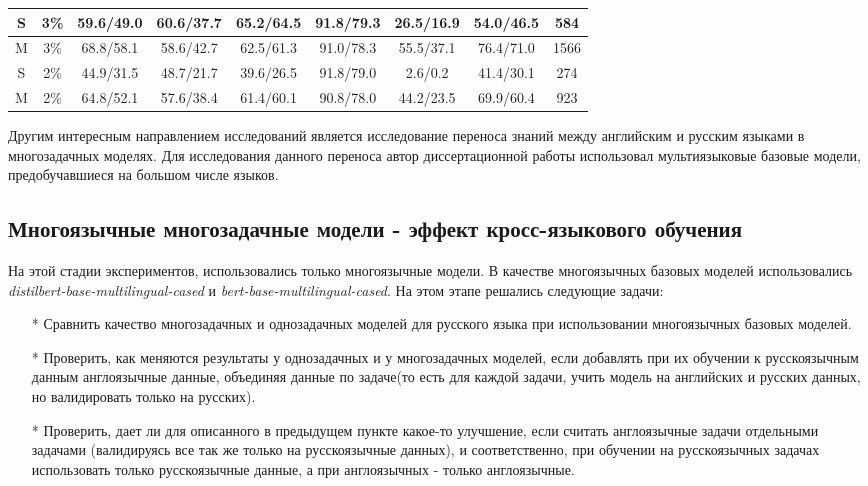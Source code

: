 \begin{table*}
{\begin{tabular}{c|c|c|c|c|c|c|c|c}
S & 3\% & 59.6/49.0 & 60.6/37.7 & 65.2/64.5 & 91.8/79.3 & 26.5/16.9 & 54.0/46.5 & 584 \\ \hline
M & 3\% & 68.8/58.1 & 58.6/42.7 & 62.5/61.3 & 91.0/78.3 & 55.5/37.1 & 76.4/71.0 & 1566 \\ \hline
S & 2\% & 44.9/31.5 & 48.7/21.7 & 39.6/26.5 & 91.8/79.0 & 2.6/0.2 & 41.4/30.1 & 274 \\ \hline
M & 2\% & 64.8/52.1 & 57.6/38.4 & 61.4/60.1 & 90.8/78.0 & 44.2/23.5 & 69.9/60.4 & 923 \\ \hline
\end{tabular}
}
\end{table*}


Другим интересным направлением исследований является исследование переноса знаний между английским и русским языками в многозадачных моделях. Для исследования данного переноса автор диссертационной работы использовал мультиязыковые базовые модели, предобучавшиеся на большом числе языков. 


\subsection{Многоязычные многозадачные модели - эффект кросс-языкового обучения}

На этой стадии экспериментов, использовались только многоязычные модели. В качестве многоязычных базовых моделей использовались \textit{distilbert-base-multilingual-cased} и \textit{bert-base-multilingual-cased}. На этом этапе решались следующие задачи:

 \begin{itemize}
\item[*] Сравнить качество многозадачных и однозадачных моделей для русского языка при использовании многоязычных базовых моделей. 
\item[*] Проверить, как меняются результаты у однозадачных и у многозадачных моделей, если добавлять при их обучении к русскоязычным данным англоязычные данные, объединяя данные по задаче(то есть для каждой задачи, учить модель на английских и русских данных, но валидировать только на русских). 
\item[*] Проверить, дает ли для описанного в предыдущем пункте какое-то улучшение, если считать англоязычные задачи отдельными задачами (валидируясь все так же только на русскоязычные данных), и соответственно, при обучении на русскоязычных задачах использовать только русскоязычные данные, а при англоязычных - только англоязычные. 
\end{itemize} 

